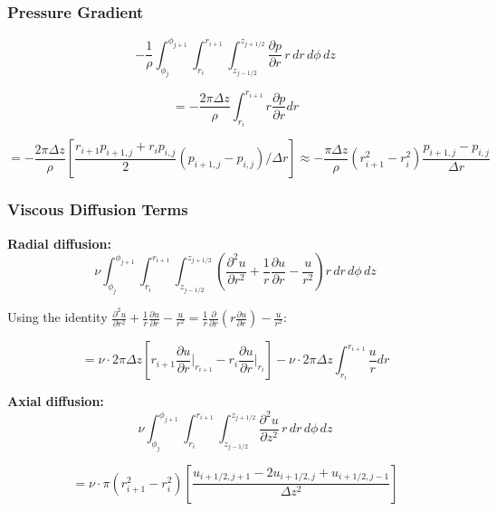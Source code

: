 \subsubsection{Pressure Gradient}

\begin{equation}
    -\frac{1}{\rho}\int_{\phi_j}^{\phi_{j+1}} \int_{r_{i}}^{r_{i+1}} \int_{z_{j-1/2}}^{z_{j+1/2}} \frac{\partial p}{\partial r} \, r\,dr\,d\phi\,dz
\end{equation}

\begin{equation}
    = -\frac{2\pi \Delta z}{\rho} \int_{r_i}^{r_{i+1}} r\frac{\partial p}{\partial r} dr
\end{equation}

\begin{equation}
    \boxed{= -\frac{2\pi \Delta z}{\rho} \left[\frac{r_{i+1} p_{i+1,j} + r_i p_{i,j}}{2}(p_{i+1,j} - p_{i,j})/\Delta r\right] \approx -\frac{\pi \Delta z}{\rho}(r_{i+1}^2 - r_i^2)\frac{p_{i+1,j} - p_{i,j}}{\Delta r}}
\end{equation}

\subsubsection{Viscous Diffusion Terms}

\textbf{Radial diffusion:}
\begin{equation}
    \nu \int_{\phi_j}^{\phi_{j+1}} \int_{r_{i}}^{r_{i+1}} \int_{z_{j-1/2}}^{z_{j+1/2}} \left(\frac{\partial^2 u}{\partial r^2} + \frac{1}{r}\frac{\partial u}{\partial r} - \frac{u}{r^2}\right) r\,dr\,d\phi\,dz
\end{equation}

Using the identity $\frac{\partial^2 u}{\partial r^2} + \frac{1}{r}\frac{\partial u}{\partial r} - \frac{u}{r^2} = \frac{1}{r}\frac{\partial}{\partial r}\left(r\frac{\partial u}{\partial r}\right) - \frac{u}{r^2}$:

\begin{equation}
    \boxed{= \nu \cdot 2\pi \Delta z \left[r_{i+1}\frac{\partial u}{\partial r}\bigg|_{r_{i+1}} - r_i\frac{\partial u}{\partial r}\bigg|_{r_i}\right] - \nu \cdot 2\pi \Delta z \int_{r_i}^{r_{i+1}} \frac{u}{r} dr}
\end{equation}

\textbf{Axial diffusion:}
\begin{equation}
    \nu \int_{\phi_j}^{\phi_{j+1}} \int_{r_{i}}^{r_{i+1}} \int_{z_{j-1/2}}^{z_{j+1/2}} \frac{\partial^2 u}{\partial z^2} \, r\,dr\,d\phi\,dz
\end{equation}

\begin{equation}
    \boxed{= \nu \cdot \pi(r_{i+1}^2 - r_i^2) \left[\frac{u_{i+1/2,j+1} - 2u_{i+1/2,j} + u_{i+1/2,j-1}}{\Delta z^2}\right]}
\end{equation}